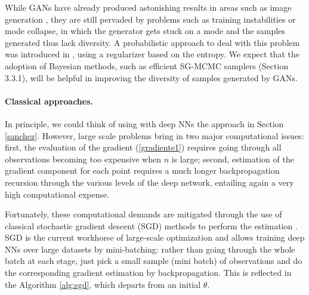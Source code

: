 While GANs have already produced astonishing results in areas such as image generation \parencite{Karras2019stylegan2,brock2018large}, they are still pervaded by problems such as training instabilities or mode collapse, in which the generator gets stuck on a mode and the samples generated thus lack diversity. A probabilistic approach to deal with this problem was introduced in \parencite{dieng2019prescribed}, using a regularizer based on the entropy. We expect that the adoption of Bayesian methods,
 such as efficient SG-MCMC samplers (Section 3.3.1), will be helpful
in improving the diversity of samples generated by GANs.

\paragraph{Classical approaches.}

In principle, we could think of using 
with deep NNs the approach in Section \ref{sanchez}. However,
 large scale problems bring in two major
computational issues: first, the 
evaluation of the gradient (\ref{gradiente1}) 
requires going through all observations
 becoming too expensive when $n$ is large;
second, estimation of the gradient component
for each point requires a much longer backpropagation recursion through the various levels of the
deep network, 
entailing again a very high computational 
expense. 

Fortunately, these computational demands are mitigated
through the use of classical stochastic gradient descent
(SGD)
methods \parencite{robbins}
to perform the estimation \parencite{bottou2010large}. SGD is the current workhorse of large-scale optimization and 
allows training deep NNs over large datasets by mini-batching: rather than going through the whole batch at each stage, just pick a small sample
(mini batch) of observations and do the corresponding
gradient estimation by backpropagation. This is reflected in the Algorithm \ref{alg:sgd}, which departs from an
initial $\theta$.

